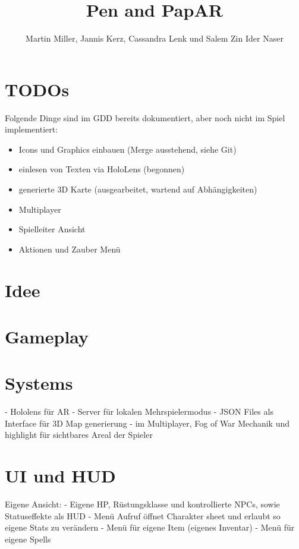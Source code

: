 \documentclass[11pt]{article}
\begin{document}
    \title{Pen and PapAR}
    \author{Martin Miller, Jannis Kerz, Cassandra Lenk und Salem Zin Ider Naser}

    \maketitle
    \newpage

    \tableofcontents
    \newpage

    \section{TODOs}\label{sec:todos}
    Folgende Dinge sind im GDD bereits dokumentiert, aber noch nicht im Spiel implementiert:

    \begin{itemize}
        \item Icons und Graphics einbauen (Merge ausstehend, siehe Git)
        \item einlesen von Texten via HoloLens (begonnen)
        \item generierte 3D Karte (ausgearbeitet, wartend auf Abhängigkeiten)
        \item Multiplayer
        \item Spielleiter Ansicht
        \item Aktionen und Zauber Menü
    \end{itemize}


    \section{Idee}\label{sec:chapter_idea}
    

    \section{Gameplay}\label{sec:chapter_gameplay}
    

    \section{Systems}\label{sec:systems}
    - Hololens für AR
    - Server für lokalen Mehrspielermodus
    - JSON Files als Interface für 3D Map generierung
    - im Multiplayer, Fog of War Mechanik und highlight für sichtbares Areal der Spieler

    \section{UI und HUD}\label{sec:ui-und-hud}
    Eigene Ansicht:
    - Eigene HP, Rüstungsklasse und kontrollierte NPCs, sowie Statuseffekte als HUD
    - Menü Aufruf öffnet Charakter sheet und erlaubt so eigene Stats zu verändern
    - Menü für eigene Item (eigenes Inventar)
    - Menü für eigene Spells
\end{document}
